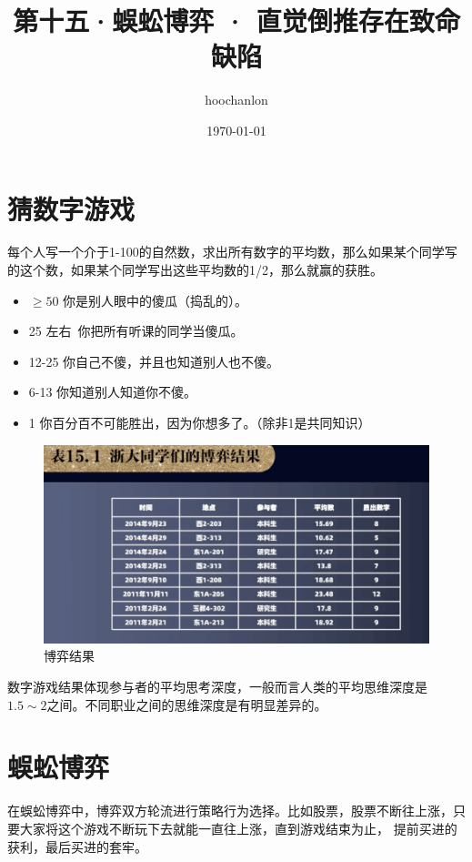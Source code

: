 \documentclass[12pt, a4paper]{article}
\title{第十五·蜈蚣博弈 · 直觉倒推存在致命缺陷}
\author{hoochanlon}
\date{\today}
\begin{document}
	\begin{CJK*}{UTF8}{gbsn}
		\maketitle

        \clearpage
        \section{猜数字游戏}
        每个人写一个介于1-100的自然数，求出所有数字的平均数，那么如果某个同学写的这个数，如果某个同学写出这些平均数的1/2，那么就赢的获胜。
        \begin{itemize}
            \item $\geq 50$ 你是别人眼中的傻瓜（捣乱的）。
            \item 25 左右~你把所有听课的同学当傻瓜。
            \item 12-25 你自己不傻，并且也知道别人也不傻。
            \item 6-13 你知道别人知道你不傻。
            \item 1 你百分百不可能胜出，因为你想多了。（除非1是共同知识）
            \end{itemize}

            \begin{figure}[htbp]
                \centering
                \includegraphics[width=1\textwidth]{./figures/catch2023-07-31-21.01.04.png}
                \caption{博弈结果}
            \end{figure}
            数字游戏结果体现参与者的平均思考深度，一般而言人类的平均思维深度是$1.5\sim2$之间。不同职业之间的思维深度是有明显差异的。

            \section{蜈蚣博弈}
            在蜈蚣博弈中，博弈双方轮流进行策略行为选择。比如股票，股票不断往上涨，只要大家将这个游戏不断玩下去就能一直往上涨，直到游戏结束为止，
            提前买进的获利，最后买进的套牢。


\end{CJK*}
\end{document}
